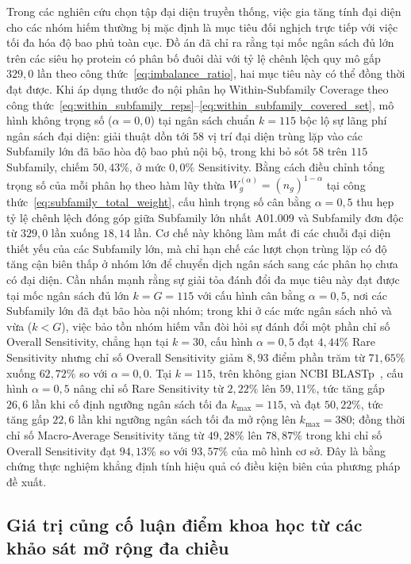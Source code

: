 Trong các nghiên cứu chọn tập đại diện truyền thống, việc gia tăng tính đại diện cho các nhóm hiếm thường bị mặc định là mục tiêu đối nghịch trực tiếp với việc tối đa hóa độ bao phủ toàn cục. Đồ án đã chỉ ra rằng tại mốc ngân sách đủ lớn trên các siêu họ protein có phân bố đuôi dài với tỷ lệ chênh lệch quy mô gấp $329{,}0$ lần theo công thức~\eqref{eq:imbalance_ratio}, hai mục tiêu này có thể đồng thời đạt được. Khi áp dụng thước đo nội phân họ Within-Subfamily Coverage theo công thức~\eqref{eq:within_subfamily_reps}--\eqref{eq:within_subfamily_covered_set}, mô hình không trọng số ($\alpha = 0{,}0$) tại ngân sách chuẩn $k = 115$ bộc lộ sự lãng phí ngân sách đại diện: giải thuật dồn tới $58$ vị trí đại diện trùng lặp vào các Subfamily lớn đã bão hòa độ bao phủ nội bộ, trong khi bỏ sót $58$ trên $115$ Subfamily, chiếm $50{,}43\%$, ở mức $0{,}0\%$ Sensitivity. Bằng cách điều chỉnh tổng trọng số của mỗi phân họ theo hàm lũy thừa $W_g^{(\alpha)} = (n_g)^{1-\alpha}$ tại công thức~\eqref{eq:subfamily_total_weight}, cấu hình trọng số cân bằng $\alpha = 0{,}5$ thu hẹp tỷ lệ chênh lệch đóng góp giữa Subfamily lớn nhất A01.009 và Subfamily đơn độc từ $329{,}0$ lần xuống $18{,}14$ lần. Cơ chế này không làm mất đi các chuỗi đại diện thiết yếu của các Subfamily lớn, mà chỉ hạn chế các lượt chọn trùng lặp có độ tăng cận biên thấp ở nhóm lớn để chuyển dịch ngân sách sang các phân họ chưa có đại diện. Cần nhấn mạnh rằng sự giải tỏa đánh đổi đa mục tiêu này đạt được tại mốc ngân sách đủ lớn $k = G = 115$ với cấu hình cân bằng $\alpha = 0{,}5$, nơi các Subfamily lớn đã đạt bão hòa nội nhóm; trong khi ở các mức ngân sách nhỏ và vừa ($k < G$), việc bảo tồn nhóm hiếm vẫn đòi hỏi sự đánh đổi một phần chỉ số Overall Sensitivity, chẳng hạn tại $k = 30$, cấu hình $\alpha = 0{,}5$ đạt $4{,}44\%$ Rare Sensitivity nhưng chỉ số Overall Sensitivity giảm $8{,}93$ điểm phần trăm từ $71{,}65\%$ xuống $62{,}72\%$ so với $\alpha = 0{,}0$. Tại $k = 115$, trên không gian NCBI BLASTp~\cite{blast}, cấu hình $\alpha = 0{,}5$ nâng chỉ số Rare Sensitivity từ $2{,}22\%$ lên $59{,}11\%$, tức tăng gấp $26{,}6$ lần khi cố định ngưỡng ngân sách tối đa $k_{\max} = 115$, và đạt $50{,}22\%$, tức tăng gấp $22{,}6$ lần khi ngưỡng ngân sách tối đa mở rộng lên $k_{\max} = 380$; đồng thời chỉ số Macro-Average Sensitivity tăng từ $49{,}28\%$ lên $78{,}87\%$ trong khi chỉ số Overall Sensitivity đạt $94{,}13\%$ so với $93{,}57\%$ của mô hình cơ sở. Đây là bằng chứng thực nghiệm khẳng định tính hiệu quả có điều kiện biên của phương pháp đề xuất.

\subsection{Giá trị củng cố luận điểm khoa học từ các khảo sát mở rộng đa chiều}
\label{subsec:conc_reinforcing_surveys}
\label{subsec:conc_exploratory_esm2}


